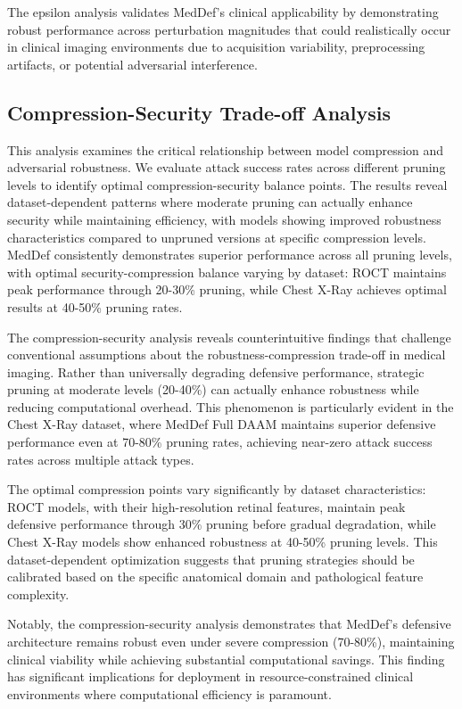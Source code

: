 \documentclass[preprint,12pt]{elsarticle}
\begin{document}
The epsilon analysis validates MedDef's clinical applicability by demonstrating robust performance across perturbation magnitudes that could realistically occur in clinical imaging environments due to acquisition variability, preprocessing artifacts, or potential adversarial interference.

\subsection{Compression-Security Trade-off Analysis}
This analysis examines the critical relationship between model compression and adversarial robustness. We evaluate attack success rates across different pruning levels to identify optimal compression-security balance points. The results reveal dataset-dependent patterns where moderate pruning can actually enhance security while maintaining efficiency, with models showing improved robustness characteristics compared to unpruned versions at specific compression levels. MedDef consistently demonstrates superior performance across all pruning levels, with optimal security-compression balance varying by dataset: ROCT maintains peak performance through 20-30\% pruning, while Chest X-Ray achieves optimal results at 40-50\% pruning rates.

The compression-security analysis reveals counterintuitive findings that challenge conventional assumptions about the robustness-compression trade-off in medical imaging. Rather than universally degrading defensive performance, strategic pruning at moderate levels (20-40\%) can actually enhance robustness while reducing computational overhead. This phenomenon is particularly evident in the Chest X-Ray dataset, where MedDef Full DAAM maintains superior defensive performance even at 70-80\% pruning rates, achieving near-zero attack success rates across multiple attack types.

The optimal compression points vary significantly by dataset characteristics: ROCT models, with their high-resolution retinal features, maintain peak defensive performance through 30\% pruning before gradual degradation, while Chest X-Ray models show enhanced robustness at 40-50\% pruning levels. This dataset-dependent optimization suggests that pruning strategies should be calibrated based on the specific anatomical domain and pathological feature complexity.

Notably, the compression-security analysis demonstrates that MedDef's defensive architecture remains robust even under severe compression (70-80\%), maintaining clinical viability while achieving substantial computational savings. This finding has significant implications for deployment in resource-constrained clinical environments where computational efficiency is paramount.
\end{document}
